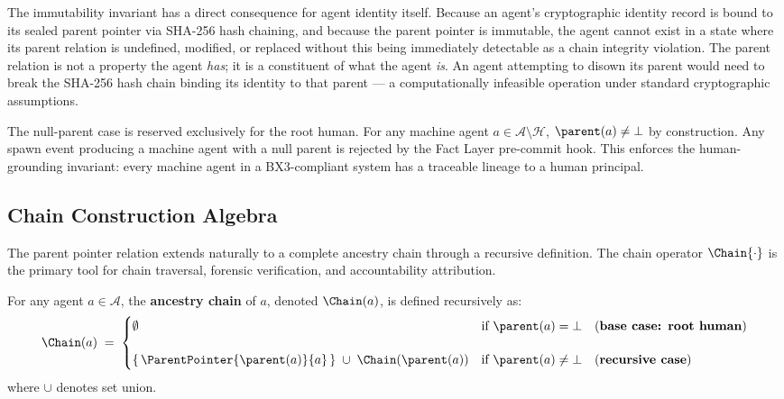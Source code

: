 The immutability invariant has a direct consequence for agent identity itself. Because an agent's cryptographic identity record is bound to its sealed parent pointer via SHA-256 hash chaining, and because the parent pointer is immutable, the agent cannot exist in a state where its parent relation is undefined, modified, or replaced without this being immediately detectable as a chain integrity violation. The parent relation is not a property the agent \emph{has}; it is a constituent of what the agent \emph{is}. An agent attempting to disown its parent would need to break the SHA-256 hash chain binding its identity to that parent --- a computationally infeasible operation under standard cryptographic assumptions.

The null-parent case is reserved exclusively for the root human. For any machine agent $a \in \mathcal{A} \setminus \mathcal{H}$, $\parent(a) \neq \bot$ by construction. Any spawn event producing a machine agent with a null parent is rejected by the Fact Layer pre-commit hook. This enforces the human-grounding invariant: every machine agent in a BX3-compliant system has a traceable lineage to a human principal.

\subsection{Chain Construction Algebra}
\label{sec:chain_construction_algebra}

The parent pointer relation extends naturally to a complete ancestry chain through a recursive definition. The chain operator $\Chain{\cdot}$ is the primary tool for chain traversal, forensic verification, and accountability attribution.

\begin{definition}
\label{def:ancestry_chain}
For any agent $a \in \mathcal{A}$, the \textbf{ancestry chain} of $a$, denoted $\Chain(a)$, is defined recursively as:
\begin{equation}
\Chain(a) \;=\;
\begin{cases}
\emptyset & \text{if } \parent(a) = \bot \quad \text{(\textbf{base case: root human})} \\[12pt]
\{\,\ParentPointer{\parent(a)}{a}\,\} \; \cup \; \Chain(\parent(a)) & \text{if } \parent(a) \neq \bot \quad \text{(\textbf{recursive case})}
\end{cases}
\label{eq:chain_recursive_def}
\end{equation}
where $\cup$ denotes set union.
\end{definition}

